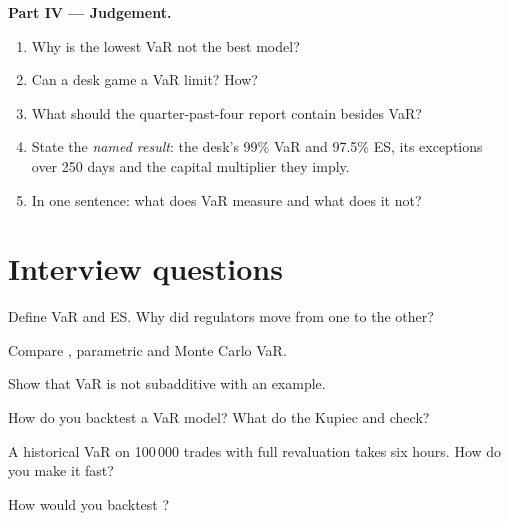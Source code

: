 \begin{problem}
\medskip\noindent\textbf{Part IV --- Judgement.}
\begin{enumerate}[resume]
\item Why is the lowest VaR not the best model?
\item Can a desk game a VaR limit? How?
\item What should the quarter-past-four report contain besides VaR?
\item State the \emph{named result}: the desk's 99\% VaR and 97.5\% ES, its exceptions over 250
days and the capital multiplier they imply.
\item In one sentence: what does VaR measure and what does it not?
\end{enumerate}
\end{problem}

\section{Interview questions}

\begin{interviewq}\label{iq:rc:market-risk-measures:1}
Define VaR and ES. Why did regulators move from one to the other?
\end{interviewq}

\begin{interviewq}\label{iq:rc:market-risk-measures:2}
Compare , parametric and Monte Carlo VaR.
\end{interviewq}

\begin{interviewq}\label{iq:rc:market-risk-measures:3}
Show that VaR is not subadditive with an example.
\end{interviewq}

\begin{interviewq}\label{iq:rc:market-risk-measures:4}
How do you backtest a VaR model? What do the Kupiec and  check?
\end{interviewq}

\begin{interviewq}\label{iq:rc:market-risk-measures:5}
A historical VaR on 100\,000 trades with full revaluation takes six hours. How do you make it
fast?
\end{interviewq}

\begin{interviewq}\label{iq:rc:market-risk-measures:6}
How would you backtest ?
\end{interviewq}
